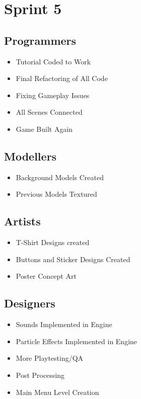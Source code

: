 \documentclass{article}
\begin{document}
\newpage
\section{Sprint 5}
\subsection{Programmers}
\begin{itemize}
    \item Tutorial Coded to Work
    \item Final Refactoring of All Code
    \item Fixing Gameplay Issues
    \item All Scenes Connected
    \item Game Built Again
\end{itemize}

\subsection{Modellers}
\begin{itemize}
    \item Background Models Created
    \item Previous Models Textured
\end{itemize}{}

\subsection{Artists}
\begin{itemize}
    \item T-Shirt Designs created
    \item Buttons and Sticker Designs Created
    \item Poster Concept Art
\end{itemize}

\subsection{Designers}
\begin{itemize}
    \item Sounds Implemented in Engine
    \item Particle Effects Implemented in Engine
    \item More Playtesting/QA
    \item Post Processing
    \item Main Menu Level Creation
\end{itemize}
\end{document}
